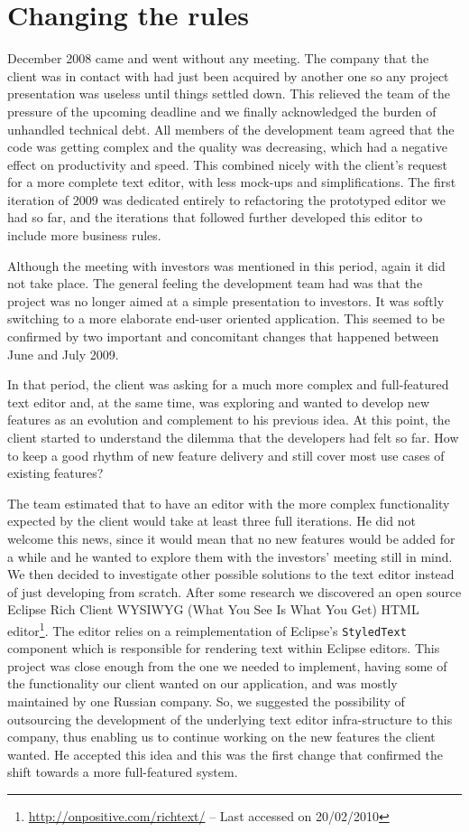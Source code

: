 \documentclass[lnbip]{svmultln}
\begin{document}
\section{Changing the rules}
\label{sec:changes}

December 2008 came and went without any meeting. The company that the client was
in contact with had just been acquired by another one so any project
presentation was useless until things settled down. This relieved the team of
the pressure of the upcoming deadline and we finally acknowledged the burden of
unhandled technical debt. All members of the development team agreed that the
code was getting complex and the quality was decreasing, which had a negative effect on
productivity and speed. This combined nicely with the client's request for a
more complete text editor, with less mock-ups and simplifications. The first
iteration of 2009 was dedicated entirely to refactoring the prototyped editor we
had so far, and the iterations that followed further developed this editor to
include more business rules.

Although the meeting with investors was mentioned in this period, again it did
not take place. The general feeling the development team had was that the
project was no longer aimed at a simple presentation to investors. It was softly
switching to a more elaborate end-user oriented application. This seemed to be
confirmed by two important and concomitant changes that happened between June
and July 2009.

In that period, the client was asking for a much more complex and full-featured
text editor and, at the same time, was exploring and wanted to develop new
features as an evolution and complement to his previous idea. At this point, the
client started to understand the dilemma that the developers had felt so far.
How to keep a good rhythm of new feature delivery and still cover most use cases
of existing features?

The team estimated that to have an editor with the more complex functionality
expected by the client would take at least three full iterations. He did not
welcome this news, since it would mean that no new features would be added for a
while and he wanted to explore them with the investors' meeting still in mind.
We then decided to investigate other possible solutions to the text editor
instead of just developing from scratch. After some research we discovered an
open source Eclipse Rich Client WYSIWYG (What You See Is What You Get) HTML
editor\footnote{\url{http://onpositive.com/richtext/} -- Last accessed on
20/02/2010}. The editor relies on a reimplementation of Eclipse's
\texttt{StyledText} component which is responsible for rendering text within
Eclipse editors. This project was close enough from the one we needed to
implement, having some of the functionality our client wanted on our
application, and was mostly maintained by one Russian company. So, we suggested
the possibility of outsourcing the development of the underlying text editor
infra-structure to this company, thus enabling us to continue working on the new
features the client wanted. He accepted this idea and this was the first change
that confirmed the shift towards a more full-featured system.
\end{document}
